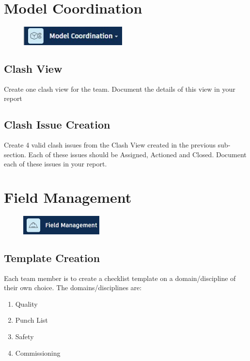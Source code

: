 \section{Model Coordination}
\begin{figure}[h!t]
	\includegraphics[height=1.0cm]{RevitAssets/modelmgmt}
	\label{fig:modelmgmt}
\end{figure}


\subsection{Clash View}
Create one clash view for the team.  Document the details of this view in your report

\subsection{Clash Issue Creation}
Create 4 valid clash issues from the Clash View created in the previous sub-section.  Each of these issues should be Assigned, Actioned and Closed.  Document each of these issues in your report.


\section{Field Management}

\begin{figure}[h!t]
	\includegraphics[height=1.0cm]{RevitAssets/fieldmgmt}
	\label{fig:dieldmgmt}
\end{figure}



\subsection{Template Creation}

Each team member is to create a checklist template on a domain/discipline of their own choice.  The domains/disciplines are:

\begin{enumerate}
	\item Quality
	\item Punch List
	\item Safety
	\item Commissioning
\end{enumerate}

